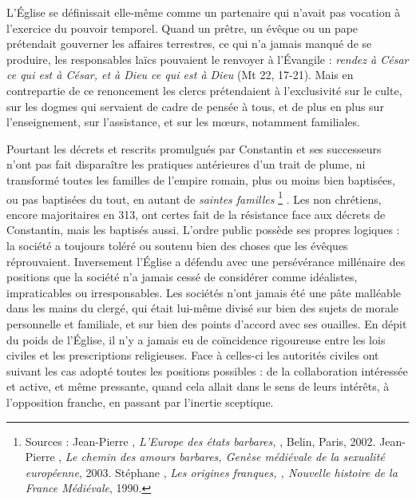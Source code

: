  L'Église se définissait elle-même comme un partenaire qui n'avait pas vocation à l'exercice du pouvoir temporel. Quand un prêtre, un évêque ou un pape prétendait gouverner les affaires terrestres, ce qui n'a jamais manqué de se produire, les responsables laïcs pouvaient le renvoyer à l'Évangile : \emph{rendez à César ce qui est à César, et à Dieu ce qui est à Dieu} (Mt 22, 17-21). Mais en contrepartie de ce renoncement les clercs prétendaient à l'exclusivité sur le culte, sur les dogmes qui servaient de cadre de pensée à tous, et de plus en plus sur l'enseignement, sur l'assistance, et sur les mœurs, notamment familiales. 

 Pourtant les décrets et rescrits promulgués par Constantin et ses successeurs n'ont pas fait disparaître les pratiques antérieures d'un trait de plume, ni transformé toutes les familles de l'empire romain, plus ou moins bien baptisées, ou pas baptisées du tout, en autant de \emph{saintes familles}%
\footnote{Sources : Jean-Pierre , \emph{L'Europe des états barbares, }, Belin, Paris, 2002. Jean-Pierre , \emph{Le chemin des amours barbares, Genèse médiévale de la sexualité européenne}, 2003. Stéphane , \emph{Les origines franques, , Nouvelle histoire de la France Médiévale}, 1990.}%
. Les non chrétiens, encore majoritaires en 313, ont certes fait de la résistance face aux décrets de Constantin, mais les baptisés aussi. L'ordre public possède ses propres logiques : la société a toujours toléré ou soutenu bien des choses que les évêques réprouvaient. Inversement l'Église a défendu avec une persévérance millénaire des positions que la société n'a jamais cessé de considérer comme idéalistes, impraticables ou irresponsables. Les sociétés n'ont jamais été une pâte malléable dans les mains du clergé, qui était lui-même divisé sur bien des sujets de morale personnelle et familiale, et sur bien des points d'accord avec ses ouailles. En dépit du poids de l'Église, il n'y a jamais eu de coïncidence rigoureuse entre les lois civiles et les prescriptions religieuses. Face à celles-ci les autorités civiles ont suivant les cas adopté toutes les positions possibles : de la collaboration intéressée et active, et même pressante, quand cela allait dans le sens de leurs intérêts, à l'opposition franche, en passant par l'inertie sceptique.

